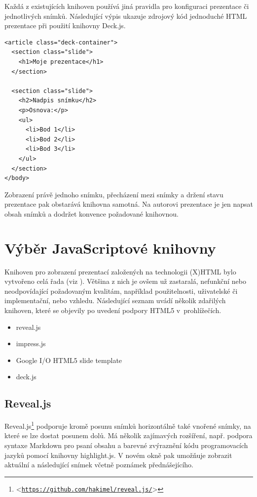 \documentclass[11pt,twoside,a4paper]{book}
\let\oldUrl\url									%
\renewcommand\url[1]{<\texttt{\oldUrl{#1}}>}
\begin{document}
Každá z existujících knihoven používá jiná pravidla pro konfiguraci prezentace či jednotlivých snímků. Následující výpis ukazuje zdrojový kód jednoduché HTML prezentace při použití knihovny Deck.js.

\begin{lstlisting}[caption=Ukázka zdrojového kódu HTML prezentace (Deck.js)]
<article class="deck-container">
  <section class="slide">
    <h1>Moje prezentace</h1>
  </section>

  <section class="slide">
    <h2>Nadpis snímku</h2>
    <p>Osnova:</p>
    <ul>
      <li>Bod 1</li>
      <li>Bod 2</li>
      <li>Bod 3</li>
    </ul>
  </section>
</body>
\end{lstlisting}

Zobrazení právě jednoho snímku, přecházení mezi snímky a držení stavu prezentace pak obstarává knihovna samotná. Na autorovi prezentace je jen napsat obsah snímků a dodržet konvence požadované knihovnou.


\section{Výběr JavaScriptové knihovny}
Knihoven pro zobrazení prezentací založených na technologii (X)HTML bylo vytvořeno celá řada (viz \cite{htmlslideshowweb}). Většina z nich je ovšem už zastaralá, nefunkční nebo neodpovídající požadovaným kvalitám, například použitelnosti, uživatelské či implementační, nebo vzhledu. Následující seznam uvádí několik zdařilých knihoven, které se objevily po uvedení podpory HTML5 v~prohlížečích.

\begin{itemize}
	\item reveal.js
	\item impress.js
	\item Google I/O HTML5 slide template
	\item deck.js
\end{itemize}


\subsection{Reveal.js} \label{chap:revealjs}
Reveal.js\footnote{\url{https://github.com/hakimel/reveal.js/}} podporuje kromě posunu snímků horizontálně také vnořené snímky, na které se lze dostat posunem dolů. Má několik zajímavých rozšíření, např. podpora syntaxe Markdown pro psaní obsahu a barevné zvýraznění kódu programovacích jazyků pomocí knihovny highlight.js. V novém okně pak umožňuje zobrazit aktuální a následující snímek včetně poznámek přednášejícího.
\end{document}
